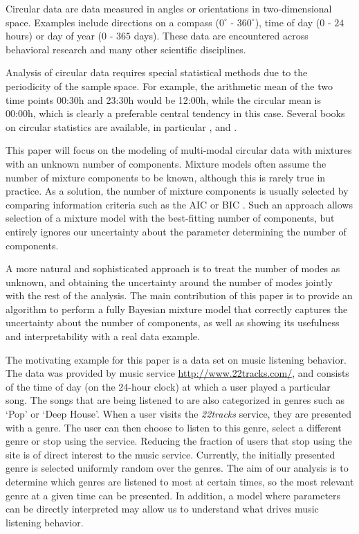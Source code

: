 \label{introduction}
Circular data are data measured in angles or orientations in two-dimensional space. Examples include directions on a compass ($0^\circ$ - $360^\circ$), time of day ($0$ - $24$ hours) or day of year ($0$ - $365$ days). These data are encountered across behavioral research \citep{Mechsner:2001ff, Gurtman:2009jz} and many other scientific disciplines.

Analysis of circular data requires special statistical methods due to the periodicity of the sample space. For example, the arithmetic mean of the two time points 00:30h and 23:30h would be 12:00h, while the circular mean is 00:00h, which is clearly a preferable central tendency in this case. Several books on circular statistics are available, in particular \citet{pewsey2013circular}, \citet{Mardia2009} and \citet{fisher1995statistical}. 

This paper will focus on the modeling of multi-modal circular data with mixtures with an unknown number of components.  Mixture models often assume the number of mixture components to be known, although this is rarely true in practice. As a solution, the number of mixture components is usually selected by comparing information criteria such as the AIC \citep{Akaike:1974ta} or BIC \citep{Schwarz:1978kf}. Such an approach allows selection of a mixture model with the best-fitting number of components, but entirely ignores our uncertainty about the parameter determining the number of components. 

A more natural and sophisticated approach is to treat the number of modes as unknown, and obtaining the uncertainty around the number of modes jointly with the rest of the analysis. The main contribution of this paper is to provide an algorithm to perform a fully Bayesian mixture model that correctly captures the uncertainty about the number of components, as well as showing its usefulness and interpretability with a real data example.

The motivating example for this paper is a data set on music listening behavior. The data was provided by music service \href{22tracks}{\url{http://www.22tracks.com/}}, and consists of the time of day (on the 24-hour clock) at which a user played a particular song. The songs that are being listened to are also categorized in genres such as `Pop' or `Deep House'. When a user visits the \textit{22tracks} service, they are presented with a genre. The user can then choose to listen to this genre, select a different genre or stop using the service. Reducing the fraction of users that stop using the site is of direct interest to the music service. Currently, the initially presented genre is selected uniformly random over the genres. The aim of our analysis is to determine which genres are listened to most at certain times, so the most relevant genre at a given time can be presented. In addition, a model where parameters can be directly interpreted may allow us to understand what drives music listening behavior.


